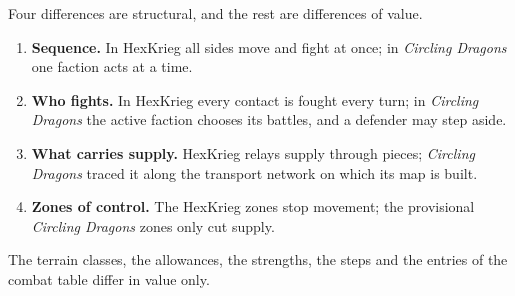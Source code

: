 \documentclass[11pt]{article}
\begin{document}
Four differences are structural, and the rest are differences of value.
\begin{enumerate}
\item \textbf{Sequence.} In HexKrieg all sides move and fight at once; in \emph{Circling Dragons} one faction acts at a time.
\item \textbf{Who fights.} In HexKrieg every contact is fought every turn; in \emph{Circling Dragons} the active faction chooses its battles, and a defender may step aside.
\item \textbf{What carries supply.} HexKrieg relays supply through pieces; \emph{Circling Dragons} traced it along the transport network on which its map is built.
\item \textbf{Zones of control.} The HexKrieg zones stop movement; the provisional \emph{Circling Dragons} zones only cut supply.
\end{enumerate}
The terrain classes, the allowances, the strengths, the steps and the entries of the combat table differ in value only.
\end{document}

